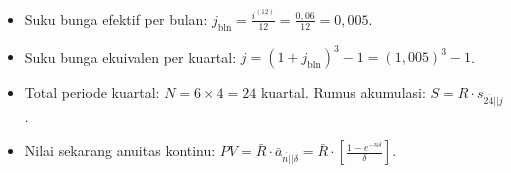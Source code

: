 \documentclass[11pt,a4paper]{article}
\newcommand{\angl}[1]{\overline{#1|}}
\begin{document}
\begin{petunjukbox}
\begin{itemize}[leftmargin=4mm, topsep=1pt, itemsep=1pt]
    \item Suku bunga efektif per bulan: $j_{\text{bln}} = \frac{i^{(12)}}{12} = \frac{0{,}06}{12} = 0{,}005$.
    \item Suku bunga ekuivalen per kuartal: $j = (1 + j_{\text{bln}})^3 - 1 = (1{,}005)^3 - 1$.
    \item Total periode kuartal: $N = 6 \times 4 = 24$ kuartal. Rumus akumulasi: $S = R \cdot s_{\angl{24}|j}$.
    \item Nilai sekarang anuitas kontinu: $PV = \bar{R} \cdot \bar{a}_{\angl{n}|\delta} = \bar{R} \cdot \left[ \frac{1 - e^{-n\delta}}{\delta} \right]$.
\end{itemize}
\end{petunjukbox}
\end{document}
